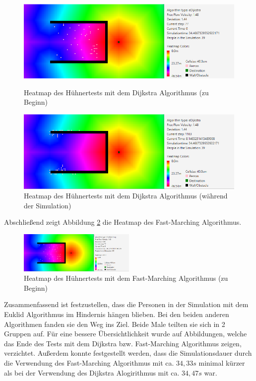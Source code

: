 \begin{figure}[!htb]
	\centering
	\begin{minipage}{.5\textwidth}
		\centering
		\includegraphics[width=\textwidth]{abbildungen/ChickenTestBeginDijkstra.PNG}
		\caption{Heatmap des Hühnertests mit dem Dijkstra Algorithmus (zu Beginn)}
		\label{fig:HühnerTestDijkstraAnfang}
	\end{minipage}%
	\begin{minipage}{0.5\textwidth}
		\centering
		\includegraphics[width=\textwidth]{abbildungen/ChickenTestMitteDijkstra.PNG}
		\caption{Heatmap des Hühnertests mit dem Dijkstra Algorithmus (während der Simulation)}
		\label{fig:HühnertestDijkstraMitte}
	\end{minipage}
\end{figure}

Abschließend zeigt Abbildung \ref{fig:HühnertestFMAnfang} die Heatmap des Fast-Marching Algorithmus. 

\begin{figure}[htpb]
	\centering
	\includegraphics[width=0.5\textwidth]{abbildungen/ChickenTestBeginFM.PNG}
	\caption{Heatmap des Hühnertests mit dem Fast-Marching Algorithmus (zu Beginn)}
	\label{fig:HühnertestFMAnfang}
\end{figure}

Zusammenfassend ist festzustellen, dass die Personen in der Simulation mit dem Euklid Algorithmus im Hindernis hängen blieben. Bei den beiden anderen Algorithmen fanden sie den Weg ins Ziel. Beide Male teilten sie sich in 2 Gruppen auf. Für eine bessere Übersichtlichkeit wurde auf Abbildungen, welche das Ende des Tests mit dem Dijkstra bzw. Fast-Marching Algorithmus zeigen, verzichtet. Außerdem konnte festgestellt werden, dass die Simulationsdauer durch die Verwendung des Fast-Marching Algorithmus mit ca. $34,33s$ minimal kürzer als bei der Verwendung des Dijkstra Alogirithmus mit ca. $34,47s$ war.

